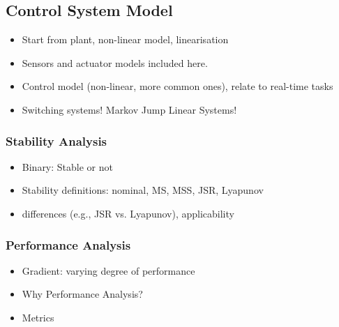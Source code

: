 {\subsection*{Control System Model}%
%
\begin{itemize}
    \item Start from plant, non-linear model, linearisation
    \item Sensors and actuator models included here.
    \item Control model (non-linear, more common ones), relate to real-time
        tasks
    \item Switching systems! Markov Jump Linear Systems!
\end{itemize}


\subsubsection*{Stability Analysis}%
%
\begin{itemize}
    \item Binary: Stable or not
    \item Stability definitions: nominal, MS, MSS, JSR, Lyapunov
    \item differences (e.g., JSR vs. Lyapunov), applicability
\end{itemize}


\subsubsection*{Performance Analysis}%
%
\begin{itemize}
    \item Gradient: varying degree of performance
    \item Why Performance Analysis?
    \item Metrics
\end{itemize}

}%


